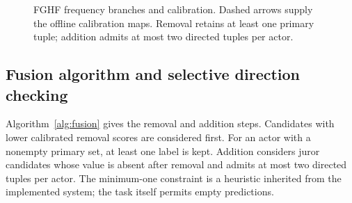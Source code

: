\documentclass[12pt,a4paper]{article}
\begin{document}
\begin{figure}[htbp]
\caption{FGHF frequency branches and calibration. Dashed arrows supply the offline calibration maps. Removal retains at least one primary tuple; addition admits at most two directed tuples per actor.}
\label{fig:fghf}
\end{figure}

\FloatBarrier
\subsection{Fusion algorithm and selective direction checking}
Algorithm~\ref{alg:fusion} gives the removal and addition steps. Candidates with lower calibrated removal scores are considered first. For an actor with a nonempty primary set, at least one label is kept. Addition considers juror candidates whose value is absent after removal and admits at most two directed tuples per actor. The minimum-one constraint is a heuristic inherited from the implemented system; the task itself permits empty predictions.
\end{document}
